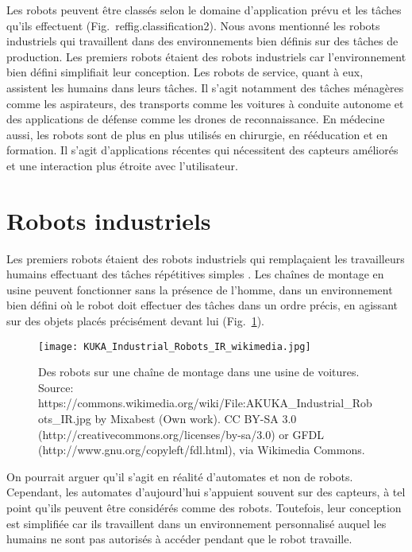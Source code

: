 {Les robots peuvent être classés selon le domaine d'application prévu et les tâches qu'ils effectuent (Fig.~ref{fig.classification2}). Nous avons mentionné les robots industriels qui travaillent dans des environnements bien définis sur des tâches de production. Les premiers robots étaient des robots industriels car l'environnement bien défini simplifiait leur conception.  Les robots de service, quant à eux, assistent les humains dans leurs tâches. Il s'agit notamment des tâches ménagères comme les aspirateurs, des transports comme les voitures à conduite autonome et des applications de défense comme les drones de reconnaissance. En médecine aussi, les robots sont de plus en plus utilisés en chirurgie, en rééducation et en formation. Il s'agit d'applications récentes qui nécessitent des capteurs améliorés et une interaction plus étroite avec l'utilisateur.

\section{Robots industriels}

Les premiers robots étaient des robots industriels qui remplaçaient les travailleurs humains effectuant des tâches répétitives simples . Les chaînes de montage en usine peuvent fonctionner sans la présence de l'homme, dans un environnement bien défini où le robot doit effectuer des tâches dans un ordre précis, en agissant sur des objets placés précisément devant lui (Fig.~\ref{fig.assemblyline}). 

\begin{figure}
\begin{center}
\texttt{[image: KUKA\_Industrial\_Robots\_IR\_wikimedia.jpg]}
\end{center}
\caption{Des robots sur une chaîne de montage dans une usine de voitures.
 Source: https://commons.wikimedia.org/wiki/File:AKUKA\_Industrial\_Robots\_IR.jpg by Mixabest (Own work). CC BY-SA 3.0 (http://creativecommons.org/licenses/by-sa/3.0) or GFDL (http://www.gnu.org/copyleft/fdl.html), via Wikimedia Commons.}\label{fig.assemblyline}
\end{figure}

On pourrait arguer qu'il s'agit en réalité d'automates et non de robots. Cependant, les automates d'aujourd'hui s'appuient souvent sur des capteurs, à tel point qu'ils peuvent être considérés comme des robots. Toutefois, leur conception est simplifiée car ils travaillent dans un environnement personnalisé auquel les humains ne sont pas autorisés à accéder pendant que le robot travaille.

}
